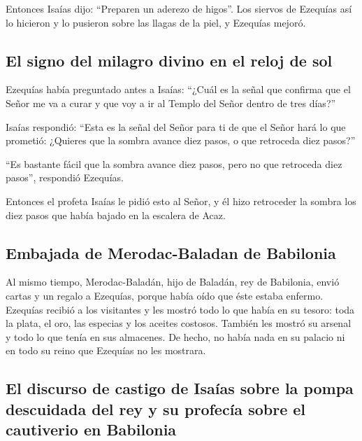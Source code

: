  Entonces Isaías dijo: ``Preparen un aderezo de higos''.
Los siervos de Ezequías así lo hicieron y lo pusieron sobre las llagas
de la piel, y Ezequías mejoró.

\hypertarget{el-signo-del-milagro-divino-en-el-reloj-de-sol}{%
\subsection{El signo del milagro divino en el reloj de
sol}\label{el-signo-del-milagro-divino-en-el-reloj-de-sol}}

 Ezequías había preguntado antes a Isaías: ``¿Cuál es la
señal que confirma que el Señor me va a curar y que voy a ir al Templo
del Señor dentro de tres días?''

 Isaías respondió: ``Esta es la señal del Señor para ti de
que el Señor hará lo que prometió: ¿Quieres que la sombra avance diez
pasos, o que retroceda diez pasos?''

 ``Es bastante fácil que la sombra avance diez pasos,
pero no que retroceda diez pasos'', respondió Ezequías.

 Entonces el profeta Isaías le pidió esto al Señor, y él
hizo retroceder la sombra los diez pasos que había bajado en la escalera
de Acaz.

\hypertarget{embajada-de-merodac-baladan-de-babilonia}{%
\subsection{Embajada de Merodac-Baladan de
Babilonia}\label{embajada-de-merodac-baladan-de-babilonia}}

 Al mismo tiempo, Merodac-Baladán, hijo de Baladán, rey
de Babilonia, envió cartas y un regalo a Ezequías, porque había oído que
éste estaba enfermo.  Ezequías recibió a los visitantes y
les mostró todo lo que había en su tesoro: toda la plata, el oro, las
especias y los aceites costosos. También les mostró su arsenal y todo lo
que tenía en sus almacenes. De hecho, no había nada en su palacio ni en
todo su reino que Ezequías no les mostrara.

\hypertarget{el-discurso-de-castigo-de-isauxedas-sobre-la-pompa-descuidada-del-rey-y-su-profecuxeda-sobre-el-cautiverio-en-babilonia}{%
\subsection{El discurso de castigo de Isaías sobre la pompa descuidada
del rey y su profecía sobre el cautiverio en
Babilonia}\label{el-discurso-de-castigo-de-isauxedas-sobre-la-pompa-descuidada-del-rey-y-su-profecuxeda-sobre-el-cautiverio-en-babilonia}}

